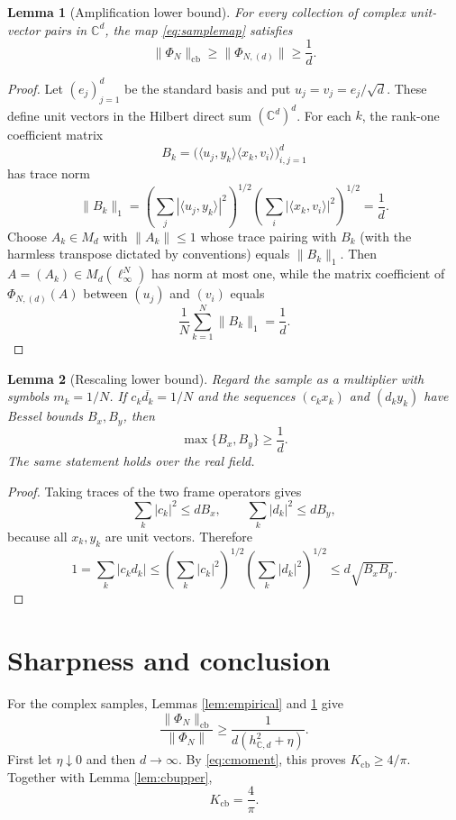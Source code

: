 \documentclass[11pt]{article}
\newtheorem{lemma}{Lemma}
\newcommand{\C}{\mathbb C}
\begin{document}
\begin{lemma}[Amplification lower bound]\label{lem:amplower}
For every collection of complex unit-vector pairs in $\C^d$, the map
\eqref{eq:samplemap} satisfies
\[
 \|\Phi_N\|_{\mathrm{cb}}\geq\|\Phi_{N,(d)}\|\geq\frac1d.
\]
\end{lemma}

\begin{proof}
Let $(e_j)_{j=1}^d$ be the standard basis and put
$u_j=v_j=e_j/\sqrt d$.  These define unit vectors in the Hilbert direct sum
$(\C^d)^d$.  For each $k$, the rank-one coefficient matrix
\[
 B_k=\big(\langle u_j,y_k\rangle\langle x_k,v_i\rangle\big)_{i,j=1}^d
\]
has trace norm
\[
 \|B_k\|_1=
 \left(\sum_j|\langle u_j,y_k\rangle|^2\right)^{1/2}
 \left(\sum_i|\langle x_k,v_i\rangle|^2\right)^{1/2}
 =\frac1d.
\]
Choose $A_k\in M_d$ with $\|A_k\|\leq1$ whose trace pairing with $B_k$
(with the harmless transpose dictated by conventions) equals $\|B_k\|_1$.
Then $A=(A_k)\in M_d(\ell_\infty^N)$ has norm at most one, while the matrix
coefficient of $\Phi_{N,(d)}(A)$ between $(u_j)$ and $(v_i)$ equals
\[
 \frac1N\sum_{k=1}^N\|B_k\|_1=\frac1d.
\]
\end{proof}

\begin{lemma}[Rescaling lower bound]\label{lem:reslower}
Regard the sample as a multiplier with symbols $m_k=1/N$.  If
$c_k\overline{d_k}=1/N$ and the sequences $(c_kx_k)$ and $(d_ky_k)$ have
Bessel bounds $B_x,B_y$, then
\[
 \max\{B_x,B_y\}\geq\frac1d.
\]
The same statement holds over the real field.
\end{lemma}

\begin{proof}
Taking traces of the two frame operators gives
\[
 \sum_k|c_k|^2\leq dB_x,
 \qquad
 \sum_k|d_k|^2\leq dB_y,
\]
because all $x_k,y_k$ are unit vectors.  Therefore
\[
 1=\sum_k|c_kd_k|
 \leq\left(\sum_k|c_k|^2\right)^{1/2}
      \left(\sum_k|d_k|^2\right)^{1/2}
 \leq d\sqrt{B_xB_y}.
\]
\end{proof}

\section*{Sharpness and conclusion}

For the complex samples, Lemmas \ref{lem:empirical} and \ref{lem:amplower}
give
\[
 \frac{\|\Phi_N\|_{\mathrm{cb}}}{\|\Phi_N\|}
 \geq\frac{1}{d(h_{\C,d}^2+\eta)}.
\]
First let $\eta\downarrow0$ and then $d\to\infty$.  By
\eqref{eq:cmoment}, this proves $K_{\mathrm{cb}}\geq4/\pi$.  Together with
Lemma \ref{lem:cbupper},
\[
 K_{\mathrm{cb}}=\frac4\pi.
\]
\end{document}
